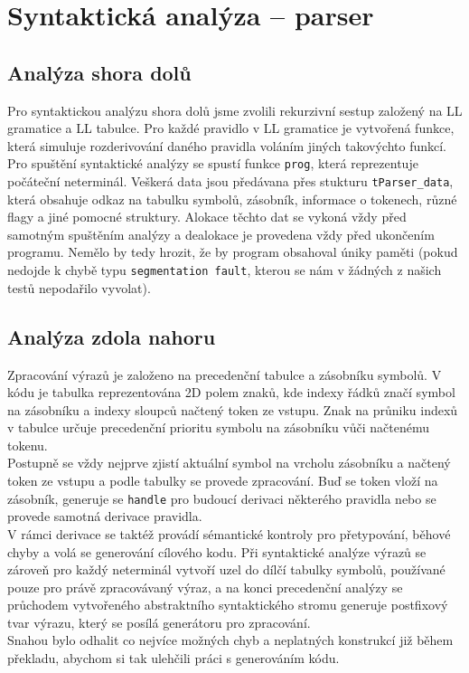 \documentclass[12pt, a4paper]{article}
\begin{document}
\section{Syntaktická analýza -- parser}
\justifying

\subsection{Analýza shora dolů}
\justifying
Pro syntaktickou analýzu shora dolů jsme zvolili rekurzivní sestup založený na LL gramatice a LL tabulce. Pro každé pravidlo v LL gramatice je vytvořená funkce, která simuluje rozderivování daného pravidla voláním jiných takovýchto funkcí. Pro spuštění syntaktické analýzy se spustí funkce \texttt{prog}, která reprezentuje počáteční neterminál. Veškerá data jsou předávana přes stukturu \texttt{tParser\_data}, která obsahuje odkaz na tabulku symbolů, zásobník, informace o tokenech, různé flagy a jiné pomocné struktury. Alokace těchto dat se vykoná vždy před samotným spuštěním analýzy a dealokace je provedena vždy před ukončením programu. Nemělo by tedy hrozit, že by program obsahoval úniky paměti (pokud nedojde k chybě typu \texttt{segmentation fault}, kterou se nám v žádných z našich testů nepodařilo vyvolat).

\newpage

\subsection{Analýza zdola nahoru}
\justifying
Zpracování výrazů je založeno na precedenční tabulce a zásobníku symbolů. V kódu je tabulka reprezentována 2D polem znaků, kde indexy řádků značí symbol na zásobníku a indexy sloupců načtený token ze vstupu. Znak na průniku indexů v tabulce určuje precedenční prioritu symbolu na zásobníku vůči načtenému tokenu. \\
Postupně se vždy nejprve zjistí aktuální symbol na vrcholu zásobníku a načtený token ze vstupu a podle tabulky se provede zpracování. Buď se token vloží na zásobník, generuje se \texttt{handle} pro budoucí derivaci některého pravidla nebo se provede samotná derivace pravidla. \\
V rámci derivace se taktéž provádí sémantické kontroly pro přetypování, běhové chyby a volá se generování cílového kodu. Při syntaktické analýze výrazů se zároveň pro každý neterminál vytvoří uzel do dílčí tabulky symbolů, používané pouze pro právě zpracovávaný výraz, a na konci precedenční analýzy se průchodem vytvořeného abstraktního syntaktického stromu generuje postfixový tvar výrazu, který se posílá generátoru pro zpracování. \\
Snahou bylo odhalit co nejvíce možných chyb a neplatných konstrukcí již během překladu, abychom si tak ulehčili práci s generováním kódu.
\end{document}
